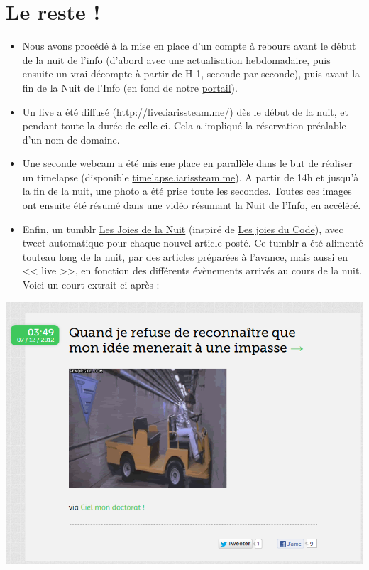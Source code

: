 \documentclass[12pt, a4paper]{article}
\newcommand{\espace}{\vspace{.8cm}}
\begin{document}
\section*{Le reste !}

\begin{itemize}
\item Nous avons procédé à la mise en place d'un compte à rebours avant le début de la nuit de l'info (d'abord avec une actualisation hebdomadaire, puis ensuite un vrai décompte à partir de H-1, seconde par seconde), puis avant la fin de la Nuit de l'Info (en fond de notre \href{http://iarissteam.me/}{portail}).

\item Un live a été diffusé (\href{http://live.iarissteam.me/}{http://live.iarissteam.me/}) dès le début de la nuit, et pendant toute la durée de celle-ci. Cela a impliqué la réservation préalable d'un nom de domaine.

\item Une seconde webcam a été mis ene place en parallèle dans le but de réaliser un timelapse (disponible \href{http://timelapse.iarissteam.me}{timelapse.iarissteam.me}). A partir de 14h et jusqu'à la fin de la nuit, une photo a été prise toute les secondes. Toutes ces images ont ensuite été résumé dans une vidéo résumant la Nuit de l'Info, en accéléré.

\item Enfin, un tumblr \href{http://lesjoiesdelanuit.tumblr.com/}{Les Joies de la Nuit} (inspiré de \href{http://lesjoiesducode.tumblr.com/}{Les joies du Code}), avec tweet automatique pour chaque nouvel article posté. Ce tumblr a été alimenté touteau long de la nuit, par des articles préparées à l'avance, mais aussi en << live >>, en fonction des différents évènements arrivés au cours de la nuit. Voici un court extrait ci-après : 
\end{itemize}

\begin{center}
\includegraphics[width=.9\textwidth, keepaspectratio=true]{tumblr.png}
\end{center}
\espace{}
\end{document}
